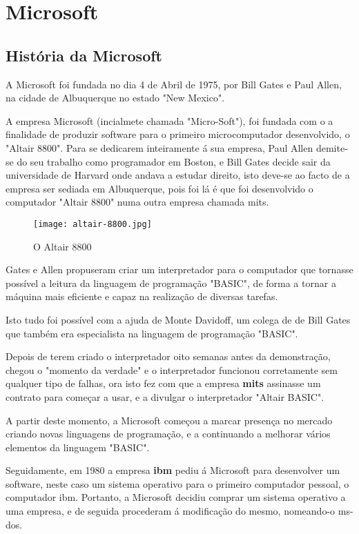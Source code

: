 \documentclass{report}
\begin{document}
\chapter{Microsoft}
\label{chap.microsoft}

\section{História da Microsoft}

A Microsoft foi fundada no dia 4 de Abril de 1975, por Bill Gates e Paul Allen, na cidade de Albuquerque no estado "New Mexico".

A empresa Microsoft (incialmete chamada "Micro-Soft"), foi fundada com o a finalidade de produzir software para o primeiro microcomputador desenvolvido, o "Altair 8800". Para se dedicarem inteiramente á sua empresa, Paul Allen
demite-se do seu trabalho como programador em Boston, e Bill Gates decide sair da universidade de Harvard onde andava a estudar direito, isto deve-se ao facto de a empresa ser sediada em Albuquerque, pois foi lá é que foi desenvolvido o computador "Altair 8800" numa outra empresa chamada \acs{mits}.

\vspace{5mm}
\begin{figure}[h!]
\texttt{[image: altair-8800.jpg]}
\centering
\caption{O Altair 8800}
\end{figure}
\vspace{5mm}

Gates e Allen propuseram criar um interpretador para o computador que tornasse possível a leitura da linguagem de programação "BASIC", de forma a tornar a máquina mais eficiente e capaz na realização de diversas tarefas.

Isto tudo foi possível com a ajuda de Monte Davidoff, um colega de de Bill Gates que também era especialista na linguagem de programação "BASIC".

Depois de terem criado o interpretador oito semanas antes da demonstração, chegou o "momento da verdade" e o interpretador funcionou corretamente sem qualquer tipo de falhas, ora isto fez com que a empresa \textbf{\ac{mits}} assinasse um contrato para começar a usar, e a divulgar o interpretador "Altair BASIC".

A partir deste momento, a Microsoft começou a marcar presença no mercado criando novas linguagens de programação, e a continuando a melhorar vários elementos da linguagem "BASIC".

Seguidamente, em 1980 a empresa \textbf{\ac{ibm}} pediu á Microsoft para desenvolver um software, neste caso um sistema operativo para o primeiro computador pessoal, o computador \acs{ibm}. Portanto, a Microsoft decidiu comprar um sistema operativo a uma empresa, e de seguida procederam á modificação do mesmo, nomeando-o \ac{ms-dos}.
\end{document}
